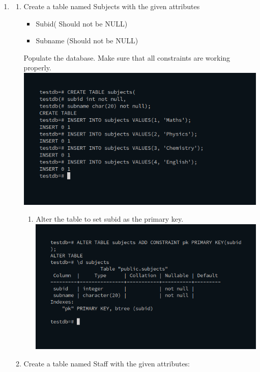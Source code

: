 \documentclass[10pt,a4paper,titlepage]{report}
\begin{document}
{\begin{enumerate}
\item
\begin{enumerate}
	\item Create a table named Subjects with the given attributes
		\begin{itemize}
			\item Subid( Should not be NULL)
			\item Subname (Should not be NULL)
		\end{itemize}
		Populate the database. Make sure that all constraints are working properly.\newline
	\includegraphics[width=\linewidth]{../Images/Constraints/1.png}\newline
		\begin{enumerate}
			\item Alter the table to set subid as the primary key.\newline
			\includegraphics[width=\linewidth]{../Images/Constraints/2.png}\newline
		\end{enumerate}
	\item Create a table named Staff with the given attributes:

\end{enumerate}
\end{enumerate}}
\end{document}
